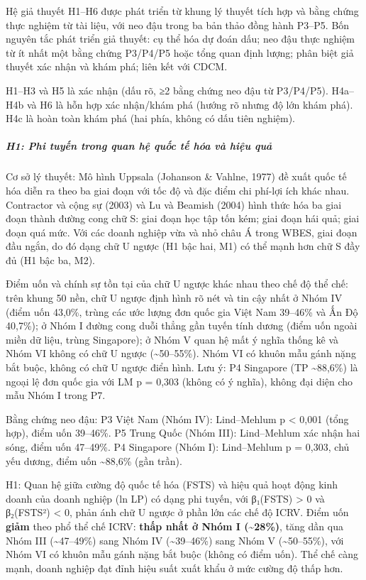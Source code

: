 \documentclass[
  a4paper,
  13pt]{extreport}
\begin{document}
Hệ giả thuyết H1--H6 được phát triển từ khung lý thuyết tích hợp và bằng
chứng thực nghiệm từ tài liệu, với neo đậu trong ba bản thảo đồng hành
P3--P5. Bốn nguyên tắc phát triển giả thuyết: cụ thể hóa dự đoán dấu;
neo đậu thực nghiệm từ ít nhất một bằng chứng P3/P4/P5 hoặc tổng quan
định lượng; phân biệt giả thuyết xác nhận và khám phá; liên kết với
CDCM.

H1--H3 và H5 là xác nhận (dấu rõ, ≥2 bằng chứng neo đậu từ P3/P4/P5).
H4a--H4b và H6 là hỗn hợp xác nhận/khám phá (hướng rõ nhưng độ lớn khám
phá). H4c là hoàn toàn khám phá (hai phía, không có dấu tiên nghiệm).

\hypertarget{h1-phi-tuyux1ebfn-trong-quan-hux1ec7-quux1ed1c-tux1ebf-huxf3a-vuxe0-hiux1ec7u-quux1ea3}{%
\subparagraph{H1: Phi tuyến trong quan hệ quốc tế hóa và hiệu
quả}\label{h1-phi-tuyux1ebfn-trong-quan-hux1ec7-quux1ed1c-tux1ebf-huxf3a-vuxe0-hiux1ec7u-quux1ea3}}

Cơ sở lý thuyết: Mô hình Uppsala (Johanson \& Vahlne, 1977) đề xuất quốc
tế hóa diễn ra theo ba giai đoạn với tốc độ và đặc điểm chi phí-lợi ích
khác nhau. Contractor và cộng sự (2003) và Lu và Beamish (2004) hình
thức hóa ba giai đoạn thành đường cong chữ S: giai đoạn học tập tốn kém;
giai đoạn hái quả; giai đoạn quá mức. Với các doanh nghiệp vừa và nhỏ
châu Á trong WBES, giai đoạn đầu ngắn, do đó dạng chữ U ngược (H1 bậc
hai, M1) có thể mạnh hơn chữ S đầy đủ (H1 bậc ba, M2).

Điểm uốn và chính sự tồn tại của chữ U ngược khác nhau theo chế độ thể
chế: trên khung 50 nền, chữ U ngược định hình rõ nét và tin cậy nhất ở
Nhóm IV (điểm uốn 43,0\%, trùng các ước lượng đơn quốc gia Việt Nam
39--46\% và Ấn Độ 40,7\%); ở Nhóm I đường cong duỗi thẳng gần tuyến tính
dương (điểm uốn ngoài miền dữ liệu, trùng Singapore); ở Nhóm V quan hệ
mất ý nghĩa thống kê và Nhóm VI không có chữ U ngược
(\textasciitilde50--55\%). Nhóm VI có khuôn mẫu gánh nặng bắt buộc,
không có chữ U ngược điển hình. Lưu ý: P4 Singapore (TP
\textasciitilde88,6\%) là ngoại lệ đơn quốc gia với LM p = 0,303 (không
có ý nghĩa), không đại diện cho mẫu Nhóm I trong P7.

Bằng chứng neo đậu: P3 Việt Nam (Nhóm IV): Lind--Mehlum p \textless{}
0,001 (tổng hợp), điểm uốn 39--46\%. P5 Trung Quốc (Nhóm III):
Lind--Mehlum xác nhận hai sóng, điểm uốn 47--49\%. P4 Singapore (Nhóm
I): Lind--Mehlum p = 0,303, chủ yếu dương, điểm uốn
\textasciitilde88,6\% (gần trần).

H1: Quan hệ giữa cường độ quốc tế hóa (FSTS) và hiệu quả hoạt động kinh
doanh của doanh nghiệp (ln LP) có dạng phi tuyến, với β₁(FSTS)
\textgreater{} 0 và β₂(FSTS²) \textless{} 0, phản ánh chữ U ngược ở phần
lớn các chế độ ICRV. Điểm uốn \textbf{giảm} theo phổ thể chế ICRV:
\textbf{thấp nhất ở Nhóm I (\textasciitilde28\%)}, tăng dần qua Nhóm III
(\textasciitilde47--49\%) sang Nhóm IV (\textasciitilde39--46\%) sang
Nhóm V (\textasciitilde50--55\%), với Nhóm VI có khuôn mẫu gánh nặng bắt
buộc (không có điểm uốn). Thể chế càng mạnh, doanh nghiệp đạt đỉnh hiệu
suất xuất khẩu ở mức cường độ thấp hơn.
\end{document}
